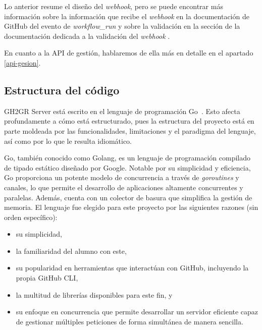 Lo anterior resume el diseño del \textit{webhook}, pero se puede encontrar más información sobre la información que recibe el \textit{webhook} en la documentación de GitHub del evento de \textit{workflow\_run} \cite{githubWebhookEvents} y sobre la validación en la sección de la documentación dedicada a la validación del \textit{webhook} \cite{githubValidatingWebhook}.

En cuanto a la \acrshort{API} de gestión, hablaremos de ella más en detalle en el apartado \ref{api-gesion}.
\subsection{Estructura del código}

GH2GR Server está escrito en el lenguaje de programación Go~\cite{goProgrammingLanguage}. Esto afecta profundamente a cómo está estructurado, pues la estructura del proyecto está en parte moldeada por las funcionalidades, limitaciones y el paradigma del lenguaje, así como por lo que le resulta idiomático.

Go, también conocido como Golang, es un lenguaje de programación compilado de tipado estático diseñado por Google. Notable por su simplicidad y eficiencia, Go proporciona un potente modelo de concurrencia a través de \textit{goroutines} y canales, lo que permite el desarrollo de aplicaciones altamente concurrentes y paralelas\cite{stackoverflowWhatapossGreat}. Además, cuenta con un colector de basura que simplifica la gestión de memoria\cite{golangGuideGarbage}. El lenguaje fue elegido para este proyecto por las siguientes razones (sin orden específico): 
\begin{itemize}
    \item su simplicidad, 
    \item la familiaridad del alumno con este, 
    \item su popularidad en herramientas que interactúan con GitHub, incluyendo la propia GitHub CLI\cite{githubGitHubClicli}, 
    \item la multitud de librerías disponibles para este fin, y 
    \item su enfoque en concurrencia que permite desarrollar un servidor eficiente capaz de gestionar múltiples peticiones de forma simultánea de manera sencilla.
\end{itemize}


